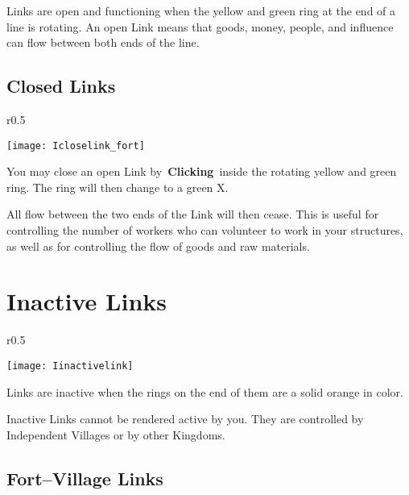 Links are open and functioning when the yellow and green ring at the end of a line is rotating. An open Link means that goods, money, people, and influence can flow between both ends of the line.

\subsection{Closed Links}


\begin{wrapfigure}{r}{0.5\textwidth}
	\vspace{-20pt}
	\begin{center}
		\texttt{[image: Icloselink\_fort]}
	\end{center}
	\vspace{-20pt}
\end{wrapfigure}

You may close an open Link by \textbf{Clicking} inside the rotating yellow and green ring. The ring will then change to a green X.

All flow between the two ends of the Link will then cease. This is useful for controlling the number of workers who can volunteer to work in your structures, as well as for controlling the flow of goods and raw materials.

\section{Inactive Links}


\begin{wrapfigure}{r}{0.5\textwidth}
	\vspace{-20pt}
	\begin{center}
		\texttt{[image: Iinactivelink]}
	\end{center}
	\vspace{-20pt}
\end{wrapfigure}

Links are inactive when the rings on the end of them are a solid orange in color.

Inactive Links cannot be rendered active by you. They are controlled by Independent Villages or by other Kingdoms. 

\subsection{Fort–Village Links}

